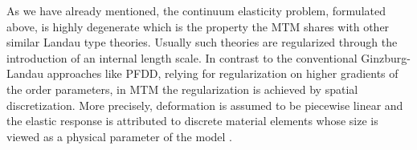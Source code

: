 \documentclass[CRPHYS,Unicode,manuscript]{cedram}
\begin{document}
As we have already mentioned, the continuum   elasticity problem, formulated above, is highly degenerate which is the property the MTM shares with other similar Landau type theories. Usually such theories are regularized  through the introduction of an  internal length scale. In contrast to the conventional Ginzburg-Landau approaches like PFDD, relying for regularization on higher gradients of the order parameters,  in    MTM the  regularization  is achieved by spatial discretization.  More precisely,   deformation is assumed to be piecewise linear and the    elastic  response is attributed   to   discrete material elements  whose size is viewed as a  physical parameter of the model  \cite{Conti2004-sv,Salman2011-ij,Baggio2019-rs}.  




\end{document}
